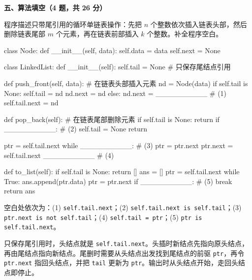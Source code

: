 \textbf{五、算法填空（4 题，共 26 分）}

\begin{question}[只带尾引用的循环单链表]
程序描述只带尾引用的循环单链表操作：先把 $n$ 个整数依次插入链表头部，然后删除链表尾部 $m$ 个元素，再在链表前部插入 $k$ 个整数。补全程序空白。

\begin{pycode}
class Node:
    def __init__(self, data):
        self.data = data
        self.next = None


class LinkedList:
    def __init__(self):
        self.tail = None        # 只保存尾结点引用

    def push_front(self, data): # 在链表头部插入元素
        nd = Node(data)
        if self.tail is None:
            self.tail = nd
            nd.next = nd
        else:
            nd.next = __________                # (1)
            self.tail.next = nd

    def pop_back(self):         # 在链表尾部删除元素
        if self.tail is None:
            return
        if __________:                          # (2)
            self.tail = None
            return

        ptr = self.tail.next
        while __________:                       # (3)
            ptr = ptr.next
        ptr.next = self.tail.next
        __________                              # (4)

    def to_list(self):
        if self.tail is None:
            return []
        ans = []
        ptr = self.tail.next
        while True:
            ans.append(ptr.data)
            ptr = ptr.next
            if __________:                      # (5)
                break
        return ans
\end{pycode}
\begin{solution}
空白处依次为：(1) \texttt{self.tail.next}；(2) \texttt{self.tail.next is self.tail}；(3) \texttt{ptr.next is not self.tail}；(4) \texttt{self.tail = ptr}；(5) \texttt{ptr is self.tail.next}。

只保存尾引用时，头结点就是 \texttt{self.tail.next}。头插时新结点先指向原头结点，再由尾结点指向新结点。尾删时需要从头结点出发找到尾结点的前驱 \texttt{ptr}，再令 \texttt{ptr.next} 指回头结点，并把 \texttt{tail} 更新为 \texttt{ptr}。输出时从头结点开始，走回头结点即停止。
\end{solution}
\end{question}


